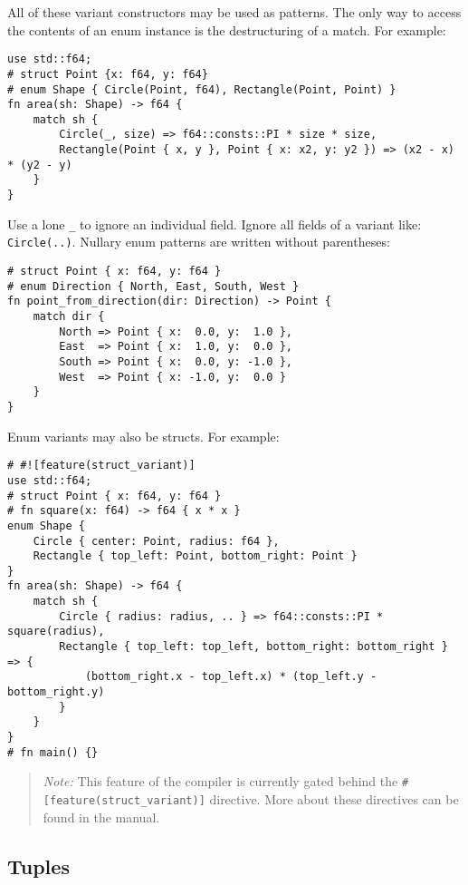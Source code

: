 \documentclass[]{article}
\begin{document}
All of these variant constructors may be used as patterns. The only way
to access the contents of an enum instance is the destructuring of a
match. For example:

\begin{verbatim}
use std::f64;
# struct Point {x: f64, y: f64}
# enum Shape { Circle(Point, f64), Rectangle(Point, Point) }
fn area(sh: Shape) -> f64 {
    match sh {
        Circle(_, size) => f64::consts::PI * size * size,
        Rectangle(Point { x, y }, Point { x: x2, y: y2 }) => (x2 - x) * (y2 - y)
    }
}
\end{verbatim}

Use a lone \texttt{\_} to ignore an individual field. Ignore all fields
of a variant like: \texttt{Circle(..)}. Nullary enum patterns are
written without parentheses:

\begin{verbatim}
# struct Point { x: f64, y: f64 }
# enum Direction { North, East, South, West }
fn point_from_direction(dir: Direction) -> Point {
    match dir {
        North => Point { x:  0.0, y:  1.0 },
        East  => Point { x:  1.0, y:  0.0 },
        South => Point { x:  0.0, y: -1.0 },
        West  => Point { x: -1.0, y:  0.0 }
    }
}
\end{verbatim}

Enum variants may also be structs. For example:

\begin{verbatim}
# #![feature(struct_variant)]
use std::f64;
# struct Point { x: f64, y: f64 }
# fn square(x: f64) -> f64 { x * x }
enum Shape {
    Circle { center: Point, radius: f64 },
    Rectangle { top_left: Point, bottom_right: Point }
}
fn area(sh: Shape) -> f64 {
    match sh {
        Circle { radius: radius, .. } => f64::consts::PI * square(radius),
        Rectangle { top_left: top_left, bottom_right: bottom_right } => {
            (bottom_right.x - top_left.x) * (top_left.y - bottom_right.y)
        }
    }
}
# fn main() {}
\end{verbatim}

\begin{quote}
\emph{Note:} This feature of the compiler is currently gated behind the
\texttt{\#{[}feature(struct\_variant){]}} directive. More about these
directives can be found in the manual.
\end{quote}

\subsection{Tuples}\label{tuples}
\end{document}
